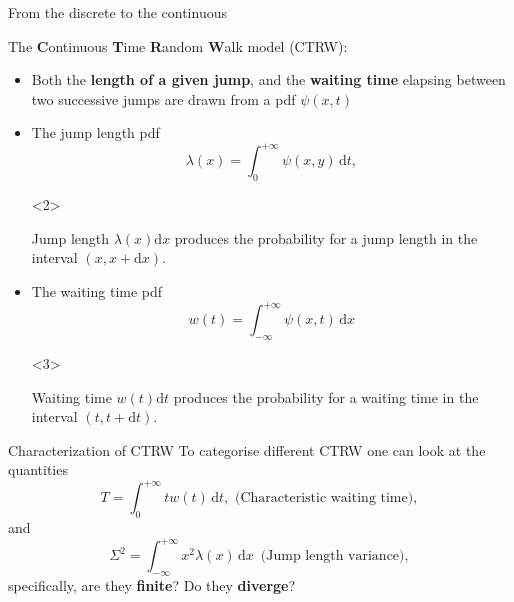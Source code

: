 \documentclass[aspectratio=169,xcolor=dvipsnames]{beamer}
\begin{document}
\begin{frame}{From the discrete to the continuous}

The \alert{\textbf{C}}ontinuous \alert{\textbf{T}}ime \alert{\textbf{R}}andom \alert{\textbf{W}}alk model (CTRW):
\begin{itemize}
	\item[\faLightbulb] Both the \textbf{length of a given jump}, and the \textbf{waiting time}
	elapsing between two successive jumps are drawn from a pdf $\psi(x,t)$
	\item[\faWalking]<2-> The jump length pdf
	\[
	\lambda(x) = \int_{0}^{+\infty} \psi(x,y)\,\textrm{d}t,
	\]
	\begin{onlyenv}
	\begin{exampleblock}{Jump length}
	$\lambda(x) \textrm{d}x$ produces the probability for a jump length in the interval $(x,x+\textrm{d}x)$.
	\end{exampleblock}
	\end{onlyenv}
	\item[\faClock]<3-> The waiting time pdf
	\[
	w(t) = \int_{-\infty}^{+\infty} \psi(x,t)\,\textrm{d}x
	\]
	\begin{onlyenv}
	\begin{exampleblock}{Waiting time}
		$w(t) \textrm{d}t$ produces the probability for a waiting time in the interval $(t,t+\textrm{d}t)$.
	\end{exampleblock}
	\end{onlyenv}
\end{itemize}

\end{frame}

\begin{frame}{Characterization of CTRW}
To categorise different CTRW one can look at the quantities
\[
T = \int_{0}^{+\infty} t w(t)\,\textrm{d}t, \text{ (Characteristic waiting time)},
\]
and 
\[
\Sigma^2 = \int_{-\infty}^{+\infty} x^2\lambda(x)\,\textrm{d}x\, \text{ (Jump length variance)},
\]
specifically, are they \textbf{finite}? Do they \textbf{diverge}?


\end{frame}
\end{document}
